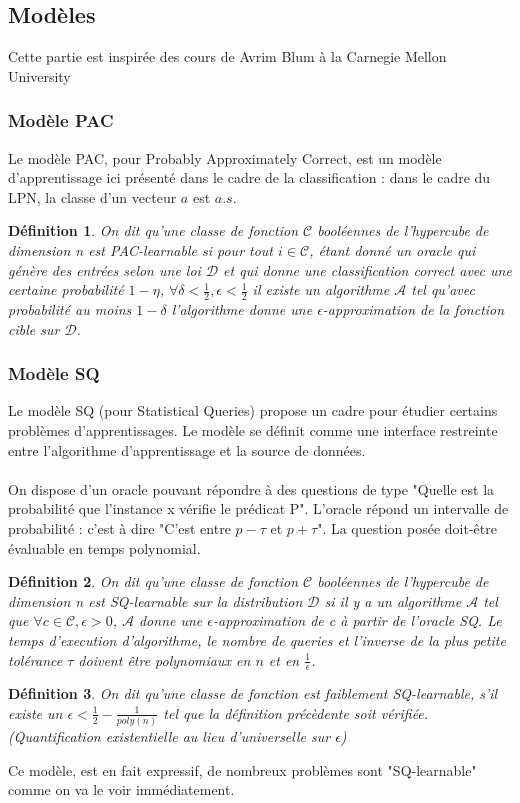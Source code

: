 \documentclass{article}		%
\newtheorem{defi}{Définition}
\theoremstyle{definition}
\theoremstyle{plain}
\begin{document}
\subsection{Modèles}
Cette partie est inspirée des cours de Avrim
Blum à la Carnegie Mellon University
\subsubsection{Modèle PAC}
Le modèle PAC, pour Probably Approximately Correct, est un modèle
d'apprentissage ici présenté dans le cadre de la
classification : dans le cadre du LPN, la classe d'un vecteur $a$ est
$a.s$.
\begin{defi}
On dit qu'une classe de fonction $\mathcal{C}$ booléennes de l'hypercube
de dimension n est PAC-learnable si pour tout $i\in\mathcal{C}$, étant donné un oracle qui génère des
entrées
selon une loi $\mathcal{D}$ et qui donne une classification correct avec une
certaine probabilité $1-\eta$, $\forall
\delta<\frac{1}{2},\epsilon<\frac{1}{2}$ il existe un algorithme
$\mathcal{A}$ tel qu'avec probabilité au moins $1-\delta$ l'algorithme donne une
$\epsilon$-approximation de la fonction cible sur $\mathcal{D}$. 
\end{defi}
\subsubsection{Modèle SQ}
Le modèle SQ (pour Statistical Queries) propose un cadre pour étudier
certains problèmes d'apprentissages. Le modèle se définit comme une
interface restreinte entre l'algorithme d'apprentissage et la source de
données.
\\
\\
On dispose d'un oracle pouvant répondre à des questions de type "Quelle
est la probabilité que l'instance x vérifie le prédicat P". L'oracle
répond un intervalle de probabilité : c'est à dire "C'est entre
$p - \tau$ et $p + \tau$". La question posée doit-être évaluable
en temps polynomial.
\\
\begin{defi}
On dit qu'une classe de fonction $\mathcal{C}$ booléennes de l'hypercube
de dimension n est SQ-learnable sur la
distribution $\mathcal{D}$ si il y a un algorithme $\mathcal{A}$
tel que $\forall c \in \mathcal{C}, \epsilon>0$, $\mathcal{A}$ donne une
$\epsilon$-approximation de c à partir de l'oracle SQ. Le temps
d'execution d'algorithme, le nombre de queries et l'inverse de la plus
petite tolérance $\tau$ doivent être polynomiaux en $n$ et en
$\frac{1}{\epsilon}$. 
\end{defi}
\begin{defi}
On dit qu'une classe de fonction est faiblement SQ-learnable, s'il existe
un $\epsilon<\frac{1}{2}-\frac{1}{poly(n)}$ tel que la définition
précèdente soit vérifiée.(Quantification existentielle au lieu
d'universelle sur $\epsilon$) 
\end{defi}
Ce modèle, est en fait expressif, de nombreux problèmes sont
"SQ-learnable" comme on va le voir immédiatement.
\end{document}
